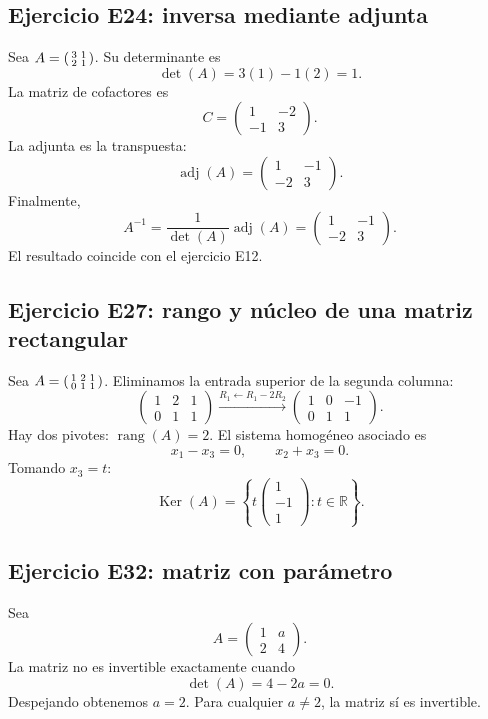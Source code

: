 \documentclass[12pt]{article}
\theoremstyle{remark}
\newcommand{\R}{\mathbb{R}}
\newcommand{\rang}{\operatorname{rang}}
\newcommand{\adj}{\operatorname{adj}}
\newcommand{\Ker}{\operatorname{Ker}}
\begin{document}
\subsection*{Ejercicio E24: inversa mediante adjunta}
Sea $A=\begin{psmallmatrix}3&1\\2&1\end{psmallmatrix}$. Su determinante es
\[
\det(A)=3(1)-1(2)=1.
\]
La matriz de cofactores es
\[
C=\begin{pmatrix}1&-2\\-1&3\end{pmatrix}.
\]
La adjunta es la transpuesta:
\[
\adj(A)=\begin{pmatrix}1&-1\\-2&3\end{pmatrix}.
\]
Finalmente,
\[
\boxed{A^{-1}=\frac{1}{\det(A)}\adj(A)
=\begin{pmatrix}1&-1\\-2&3\end{pmatrix}.}
\]
El resultado coincide con el ejercicio E12.

\subsection*{Ejercicio E27: rango y núcleo de una matriz rectangular}
Sea $A=\begin{psmallmatrix}1&2&1\\0&1&1\end{psmallmatrix}$. Eliminamos la entrada superior de la segunda columna:
\[
\begin{pmatrix}1&2&1\\0&1&1\end{pmatrix}
\xrightarrow{R_1\leftarrow R_1-2R_2}
\begin{pmatrix}1&0&-1\\0&1&1\end{pmatrix}.
\]
Hay dos pivotes: $\boxed{\rang(A)=2}$. El sistema homogéneo asociado es
\[
x_1-x_3=0,\qquad x_2+x_3=0.
\]
Tomando $x_3=t$:
\[
\boxed{\Ker(A)=\left\{t\begin{pmatrix}1\\-1\\1\end{pmatrix}:t\in\R\right\}.}
\]

\subsection*{Ejercicio E32: matriz con parámetro}
Sea
\[
A=\begin{pmatrix}1&a\\2&4\end{pmatrix}.
\]
La matriz no es invertible exactamente cuando
\[
\det(A)=4-2a=0.
\]
Despejando obtenemos $\boxed{a=2}$. Para cualquier $a\ne2$, la matriz sí es invertible.
\end{document}
